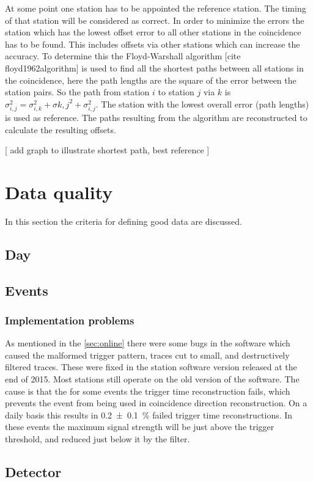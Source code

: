 At some point one station has to be appointed the reference station. The timing of that station will be considered as correct. In order to minimize the errors the station which has the lowest offset error to all other stations in the coincidence has to be found. This includes offsets via other stations which can increase the accuracy. To determine this the Floyd-Warshall algorithm [cite floyd1962algorithm] is used to find all the shortest paths between all stations in the coincidence, here the path lengths are the square of the error between the station pairs. So the path from station $i$ to station $j$ via $k$ is $\sigma_{i,j}^2 = \sigma_{i,k}^2 + \sigma{k,j}^2 + \sigma_{i, j}^2$. The station with the lowest overall error (path lengths) is used as reference. The paths resulting from the algorithm are reconstructed to calculate the resulting offsets.

[ add graph to illustrate shortest path, best reference ]


\section{Data quality}

In this section the criteria for defining good data are discussed. 


\subsection{Day}

\subsection{Events}

\subsubsection{Implementation problems}

As mentioned in the \cref{sec:online} there were some bugs in the software which caused the malformed trigger pattern, traces cut to small, and destructively filtered traces. These were fixed in the \hisparc station software version released at the end of 2015. Most stations still operate on the old version of the software. The cause is that the for some events the trigger time reconstruction fails, which prevents the event from being used in coincidence direction reconstruction. On a daily basis this results in \SI{0.2 \pm 0.1}{\percent} failed trigger time reconstructions. In these events the maximum signal strength will be just above the trigger threshold, and reduced just below it by the filter.


\subsection{Detector}

